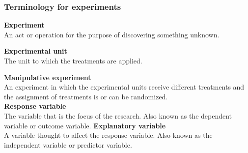 \documentclass[color=usenames,dvipsnames]{beamer}\usepackage[]{graphicx}\usepackage[]{color}
\begin{document}



\begin{frame}
  \frametitle{Terminology for experiments}
  \small
  {\bf Experiment} \\
  An act or operation for the purpose of discovering something
  unknown. \par
  \pause
  \vfill %
  {\bf Experimental unit} \\
  The unit to which the treatments are applied. \par
  \pause
  \vfill %
  {\bf Manipulative experiment} \\
  An experiment in which the experimental units receive
  different treatments and the assignment of treatments is or can
  be randomized. \\
  \pause
  \vfill
  {\bf Response variable } \\
  The variable that is the focus of the research. Also known as the
  dependent variable or outcome variable.
  \pause
  \vfill
  {\bf Explanatory variable } \\
  A variable thought to affect the response variable. Also known as the 
  independent variable or predictor variable.
\end{frame}
\end{document}
